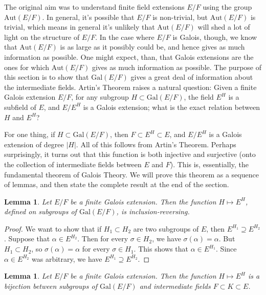 \documentclass[12pt]{report}
\newtheorem{lemma}[theorem]{Lemma}
\theoremstyle{definition}
\newcommand{\Aut}{\text{Aut}}
\newcommand{\Gal}{\text{Gal}}
\begin{document}
The original aim was to understand finite field extensions $E/F$ using the group $\Aut(E/F)$. In general, it's possible that $E/F$ is non-trivial, but $\Aut(E/F)$ is trivial, which means in general it's unlikely that $\Aut(E/F)$ will shed a lot of light on the structure of $E/F$. In the case where $E/F$ is Galois, though, we know that $\Aut(E/F)$ is as large as it possibly could be, and hence gives as much information as possible. One might expect, than, that Galois extensions are the ones for which $\Aut(E/F)$ gives as much information as possible. The purpose of this section is to show that $\Gal(E/F)$ gives a great deal of information about the intermediate fields. Artin's Theorem raises a natural question: Given a finite Galois extension $E/F$, for any subgroup $H \subset  \Gal(E/F)$, the field $E^H$ is a subfield of $E$, and $E/E^H$ is a Galois extension; what is the exact relation between $H$ and $E^H$?


For one thing, if $H \subset  \Gal(E/F)$, then $F \subset  E^H \subset  E$, and $E/E^H$ is a Galois extension of degree $|H|$. All of this follows from Artin's Theorem. Perhaps surprisingly, it turns out that this function is both injective and surjective (onto the collection of intermediate fields between $E$ and $F$). This is, essentially, the fundamental theorem of Galois Theory. We will prove this theorem as a sequence of lemmas, and then state the complete result at the end of the section.


\begin{lemma}
	Let $E/F$ be a finite Galois extension. Then the function $H \mapsto E^H$, defined on subgroups of $\Gal(E/F)$, is inclusion-reversing.
\end{lemma}

\begin{proof}
	We want to show that if $H_1 \subset H_2$ are two subgroups of $E$, then $E^{H_1}\supseteq E^{H_2}$. Suppose that $\alpha\in E^{H_2}$. Then for every $\sigma\in H_2$, we have $\sigma(\alpha) = \alpha$. But $H_1 \subset  H_2$, so $\sigma(\alpha) = \alpha$ for every $\sigma\in H_1$. This shows that $\alpha\in E^{H_1}$. Since $\alpha\in E^{H_2}$ was arbitrary, we have $E^{H_1}\supseteq E^{H_2}$.
\end{proof}

\begin{lemma}
	Let $E/F$ be a finite Galois extension. Then the function $H \mapsto E^H$ is a bijection between subgroups of $\Gal(E/F)$ and intermediate fields $F \subset  K \subset  E$.
\end{lemma}
\end{document}

